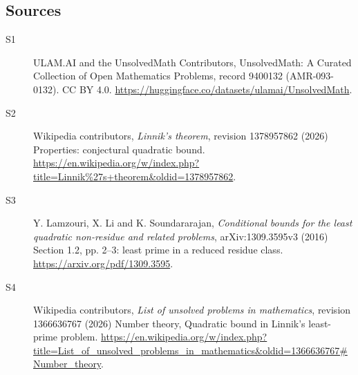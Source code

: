 \documentclass[11pt]{article}
\begin{document}
\subsection{Sources}
\begin{description}
\item[\hypertarget{source:9400132:1}{S1}] ULAM.AI and the UnsolvedMath Contributors, UnsolvedMath: A Curated Collection of Open Mathematics Problems, record 9400132 (AMR-093-0132). CC BY 4.0. \url{https://huggingface.co/datasets/ulamai/UnsolvedMath}.
\item[\hypertarget{source:9400132:2}{S2}] Wikipedia contributors, \emph{Linnik's theorem}, revision 1378957862 (2026) Properties: conjectural quadratic bound. \url{https://en.wikipedia.org/w/index.php?title=Linnik%27s+theorem&oldid=1378957862}.
\item[\hypertarget{source:9400132:3}{S3}] Y. Lamzouri, X. Li and K. Soundararajan, \emph{Conditional bounds for the least quadratic non-residue and related problems}, arXiv:1309.3595v3 (2016) Section 1.2, pp. 2--3: least prime in a reduced residue class. \url{https://arxiv.org/pdf/1309.3595}.
\item[\hypertarget{source:9400132:4}{S4}] Wikipedia contributors, \emph{List of unsolved problems in mathematics}, revision 1366636767 (2026) Number theory, Quadratic bound in Linnik's least-prime problem. \url{https://en.wikipedia.org/w/index.php?title=List_of_unsolved_problems_in_mathematics&oldid=1366636767#Number_theory}.
\end{description}
\label{end:9400132}
\end{document}
